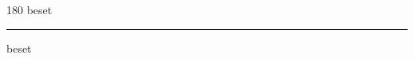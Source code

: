 
\begin{frame}
\begin{center}
\begin{turn}{180}
{\fontsize{2.5cm}{1em}\selectfont beset}
\end{turn}
\vspace{1em}\par  
\hrule
\vspace{1em}\par  
{\fontsize{2.5cm}{1em}\selectfont beset}
\end{center}
\end{frame}
